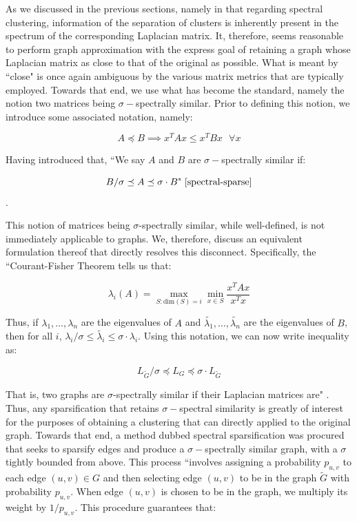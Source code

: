 \documentclass{article}
\begin{document}
As we discussed in the previous sections, namely in that regarding spectral clustering, information of the separation of clusters is inherently present in the spectrum of the corresponding Laplacian matrix. It, therefore, seems reasonable to perform graph approximation with the express goal of retaining a graph whose Laplacian matrix as close to that of the original as possible. What is meant by ``close" is once again ambiguous by the various matrix metrics that are typically employed. Towards that end, we use what has become the standard, namely the notion two matrices being $\sigma-$spectrally similar. Prior to defining this notion, we introduce some associated notation, namely:

$$ A \preceq B \implies x^T Ax \le x^T Bx \text{ } \forall x $$

Having introduced that, ``We say $A$ and $B$ are $\sigma-$spectrally similar if:

$$ B / \sigma \preceq A \preceq \sigma\cdot B\text{" \cite{spectral-sparse}} $$.

This notion of matrices being $\sigma$-spectrally similar, while well-defined, is not immediately applicable to graphs. We, therefore, discuss an equivalent formulation thereof that directly resolves this disconnect. Specifically, the ``Courant-Fisher Theorem tells us that:

$$ \lambda_i(A) = \max_{S:\text{dim}(S)=i} \min_{x\in S} \frac{x^T Ax}{x^T x} $$

Thus, if $\lambda_1,\dots,\lambda_n$ are the eigenvalues of $A$ and $\widetilde{\lambda_1},\dots,\widetilde{\lambda_n}$ are the eigenvalues of $B$, then for all $i$, $\lambda_i / \sigma \le \widetilde{\lambda_i} \le \sigma\cdot\lambda_i$. Using this notation, we can now write inequality as:

$$ L_{\widetilde{G}} / \sigma \preceq L_{G} \preceq \sigma \cdot L_{\widetilde{G}}$$

That is, two graphs are $\sigma$-spectrally similar if their Laplacian matrices are" \cite{spectral-sparse}. Thus, any sparsification that retains $\sigma-$spectral similarity is greatly of interest for the purposes of obtaining a clustering that can directly applied to the original graph. Towards that end, a method dubbed spectral sparsification was procured that seeks to sparsify edges and produce a $\sigma-$spectrally similar graph, with a $\sigma$ tightly bounded from above. This process ``involves assigning a probability $p_{u,v}$ to each edge $(u, v)\in G$ and then selecting edge $(u, v)$ to be in the graph $\widetilde{G}$ with probability $p_{u,v}$. When edge $(u, v)$ is chosen to be in the graph, we multiply its weight by $1/p_{u,v}$. This procedure guarantees that:
\end{document}
